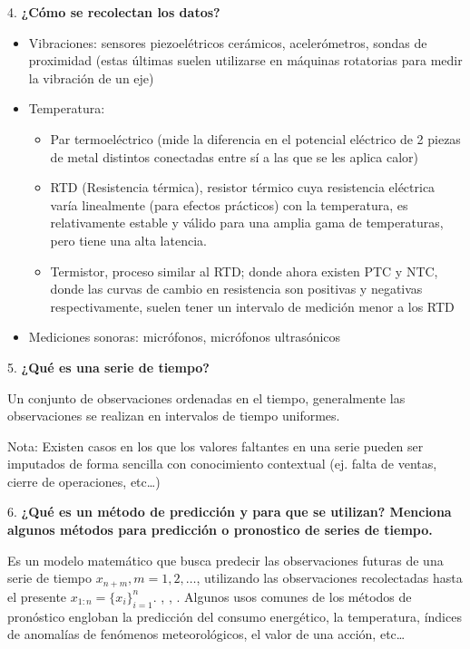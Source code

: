\documentclass{article}
\begin{document}
    4. \textbf{¿Cómo se recolectan los datos?}

    \begin{itemize}
        \item Vibraciones: sensores piezoelétricos cerámicos, acelerómetros, sondas de proximidad (estas últimas suelen utilizarse en máquinas rotatorias para medir la vibración de un eje) \cite{ni-vibration-measurement}
        \item Temperatura: \begin{itemize}
            \item Par termoeléctrico (mide la diferencia en el potencial eléctrico de 2 piezas de metal distintos conectadas entre sí a las que se les aplica calor) \cite{mcgranahan2020inconvenient}
            \item RTD (Resistencia térmica), resistor térmico cuya resistencia eléctrica varía linealmente (para efectos prácticos) con la temperatura, es relativamente estable y válido para una amplia gama de temperaturas, pero tiene una alta latencia. \cite{kim2001study}
            \item Termistor, proceso similar al RTD; donde ahora existen PTC y NTC, donde las curvas de cambio en resistencia son positivas y negativas respectivamente, suelen tener un intervalo de medición menor a los RTD \cite{reverter2021tutorial}
        \end{itemize}
        \item Mediciones sonoras: micrófonos, micrófonos ultrasónicos \cite{murphy2020choosing}
    \end{itemize}

    5. \textbf{¿Qué es una serie de tiempo?}

    Un conjunto de observaciones ordenadas en el tiempo, generalmente las observaciones se realizan en intervalos de tiempo uniformes. \cite{peixeiro2022time}

    Nota: Existen casos en los que los valores faltantes en una serie pueden ser imputados de forma sencilla con conocimiento contextual (ej. falta de ventas, cierre de operaciones, etc\dots)

    6. \textbf{¿Qué es un método de predicción y para que se utilizan? Menciona algunos métodos para predicción o pronostico de series de tiempo.}

    Es un modelo matemático que busca predecir las observaciones futuras de una serie de tiempo $x_{n+m}, m = 1, 2, \dots$, utilizando las observaciones recolectadas hasta el presente $x_{1:n} = \{x_i\}_{i=1}^{n}$. \cite{shumway2017time}, \cite{peixeiro2022time}, \cite{carvalho2019systematic}. Algunos usos comunes de los métodos de pronóstico engloban la predicción del consumo energético, la temperatura, índices de anomalías de fenómenos meteorológicos, el valor de una acción, etc\dots
\end{document}
